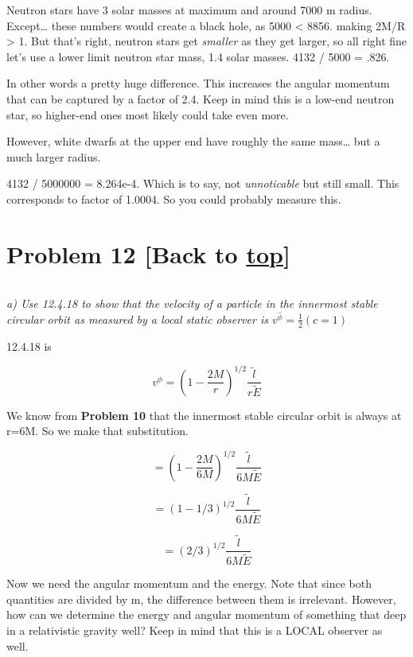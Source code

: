 \documentclass[landscape,letterpaper,10pt,english]{article}
\begin{document}
Neutron stars have 3 solar masses at maximum and around 7000 m radius.
Except\ldots{} these numbers would create a black hole, as 5000
\textless{} 8856. making 2M/R \textgreater{} 1. But that's right,
neutron stars get \emph{smaller} as they get larger, so all right fine
let's use a lower limit neutron star mass, 1.4 solar masses. 4132 / 5000
= .826.

In other words a pretty huge difference. This increases the angular
momentum that can be captured by a factor of 2.4. Keep in mind this is a
low-end neutron star, so higher-end ones most likely could take even
more.

However, white dwarfs at the upper end have roughly the same
mass\ldots{} but a much larger radius.

4132 / 5000000 = 8.264e-4. Which is to say, not \emph{unnoticable} but
still small. This corresponds to factor of 1.0004. So you could probably
measure this.

    \hypertarget{problem-12-back-to-top}{%
\section{\texorpdfstring{Problem 12 {[}Back to
\hyperref[toc]{top}{]}}{Problem 12 {[}Back to {]}}}\label{problem-12-back-to-top}}

\[\label{P12}\]

\emph{a) Use 12.4.18 to show that the velocity of a particle in the
innermost stable circular orbit as measured by a local static observer
is \(v^{\hat\phi} = \frac12 (c=1)\)}

    12.4.18 is

\[ v^\hat\phi = \left( 1 - \frac{2M}{r} \right)^{1/2} \frac{\tilde l}{r \tilde E} \]

We know from \textbf{Problem 10} that the innermost stable circular
orbit is always at r=6M. So we make that substitution.

\[ = \left( 1 - \frac{2M}{6M} \right)^{1/2} \frac{\tilde l}{6M \tilde E} \]

\[ = \left( 1 - 1/3 \right)^{1/2} \frac{\tilde l}{6M \tilde E} \]

\[ = \left( 2/3 \right)^{1/2} \frac{\tilde l}{6M \tilde E} \]

    Now we need the angular momentum and the energy. Note that since both
quantities are divided by m, the difference between them is irrelevant.
However, how can we determine the energy and angular momentum of
something that deep in a relativistic gravity well? Keep in mind that
this is a LOCAL observer as well.
\end{document}
